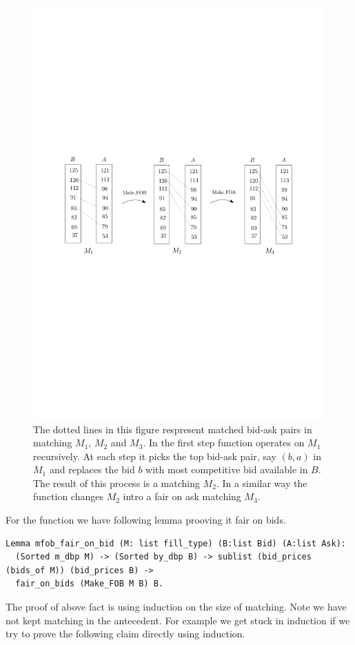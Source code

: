 \documentclass[a4paper,UKenglish,cleveref, autoref]{lipics-v2019}
\begin{document}
\begin{figure}[h!]
\centering
\includegraphics[width=.8\textwidth]{make_fair.pdf}
\caption{The dotted lines in this figure respresent  matched bid-ask pairs in  matching $M_1$, $M_2$ and $M_3$. In the first step function  operates on $M_1$ recursively. At each step it picks the top bid-ask pair, say $(b,a)$ in $M_1$ and replaces the bid  $b$ with most competitive bid available in $B$. The result of this process is a  matching $M_2$. In a similar way the function  changes $M_2$ intro a fair on ask matching $M_3$.  }
\label{fig:fair}
\end{figure}

For the function  we have following lemma prooving it fair on bids. 

\begin{verbatim}
Lemma mfob_fair_on_bid (M: list fill_type) (B:list Bid) (A:list Ask):
  (Sorted m_dbp M) -> (Sorted by_dbp B) -> sublist (bid_prices (bids_of M)) (bid_prices B) ->
  fair_on_bids (Make_FOB M B) B. 
\end{verbatim}
The proof of above fact is using induction on the size of matching. Note we have not kept matching in the antecedent. For example we get stuck in induction if we try to prove the following claim directly using induction.
\end{document}
